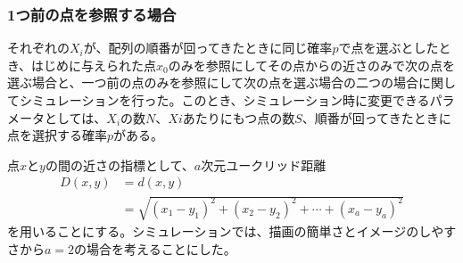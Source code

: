 \subsubsection{1つ前の点を参照する場合}

それぞれの$X_{i}$が、配列の順番が回ってきたときに同じ確率$p$で点を選ぶとしたとき、はじめに与えられた点$x_{0}$のみを参照にしてその点からの近さのみで次の点を選ぶ場合と、一つ前の点のみを参照にして次の点を選ぶ場合の二つの場合に関してシミュレーションを行った。このとき、シミュレーション時に変更できるパラメータとしては、$X_{i}$の数$N$、$X{i}$あたりにもつ点の数$S$、順番が回ってきたときに点を選択する確率$p$がある。

点$x$と$y$の間の近さの指標として、$a$次元ユークリッド距離
\begin{align}D(x, y) &= d(x,y) \nonumber\\
&= \sqrt{(x_{1} - y_{1})^{2} + (x_{2} - y_{2})^{2} + \cdots + (x_{a} - y_{a})^{2}}\end{align}
を用いることにする。シミュレーションでは、描画の簡単さとイメージのしやすさから$a=2$の場合を考えることにした。

